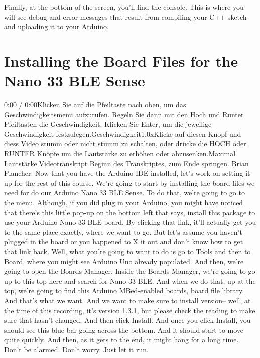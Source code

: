     Finally, at the bottom of the screen, you’ll find the console. This is where you will see debug and error messages that result from compiling your C++ sketch and uploading it to your Arduino.
    
\section{Installing the Board Files for the Nano 33 BLE Sense}


    0:00 / 0:00Klicken Sie auf die Pfeiltaste nach oben, um das Geschwindigkeitsmenu aufzurufen. Regeln Sie dann mit den Hoch und Runter Pfeiltasten die Geschwindigkeit. Klicken Sie Enter, um die jeweilige Geschwindigkeit festzulegen.Geschwindigkeit1.0xKlicke auf diesen Knopf und diess Video stumm oder nicht stumm zu schalten, oder drücke die HOCH oder RUNTER Knöpfe um die Lautstärke zu erhöhen oder abzusenken.Maximal Lautstärke.Videotranskript
    Beginn des Transkriptes, zum Ende springen.
    Brian Plancher: Now that you have the Arduino IDE installed,
    let's work on setting it up for the rest of this course.
    We're going to start by installing the board files we need
    for do our Arduino Nano 33 BLE Sense.
    To do that, we're going to go to the menu.
    Although, if you did plug in your Arduino,
    you might have noticed that there's this little pop-up on the bottom left that
    says, install this package to use your Arduino Nano 33 BLE board.
    By clicking that link, it'll actually get you to the same place exactly,
    where we want to go.
    But let's assume you haven't plugged in the board or you happened to X it out
    and don't know how to get that link back.
    Well, what you're going to want to do is go
    to Tools and then to Board, where you might
    see Arduino Uno already populated.
    And then, we're going to open the Boards Manager.
    Inside the Boards Manager, we're going to go up to this top
    here and search for Nano 33 BLE.
    And when we do that, up at the top, we're
    going to find this Arduino MBed-enabled boards, board file library.
    And that's what we want.
    And we want to make sure to install version--
    well, at the time of this recording, it's version 1.3.1,
    but please check the reading to make sure that hasn't changed.
    And then click Install.
    And once you click Install, you should see
    this blue bar going across the bottom.
    And it should start to move quite quickly.
    And then, as it gets to the end, it might hang for a long time.
    Don't be alarmed.
    Don't worry.
    Just let it run.
